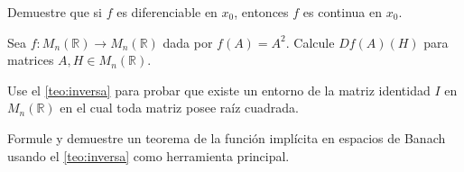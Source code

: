 \begin{exercise}
Demuestre que si $f$ es diferenciable en $x_0$, entonces $f$ es continua en
$x_0$.
\end{exercise}

\begin{exercise}
Sea $f\colon M_n(\mathbb{R})\to M_n(\mathbb{R})$ dada por $f(A)=A^2$. Calcule
$Df(A)(H)$ para matrices $A,H\in M_n(\mathbb{R})$.
\end{exercise}

\begin{exercise}
Use el \cref{teo:inversa} para probar que existe un entorno de la matriz
identidad $I$ en $M_n(\mathbb{R})$ en el cual toda matriz posee raíz cuadrada.
\end{exercise}

\begin{problem}
Formule y demuestre un teorema de la función implícita en espacios de Banach
usando el \cref{teo:inversa} como herramienta principal.
\end{problem}
